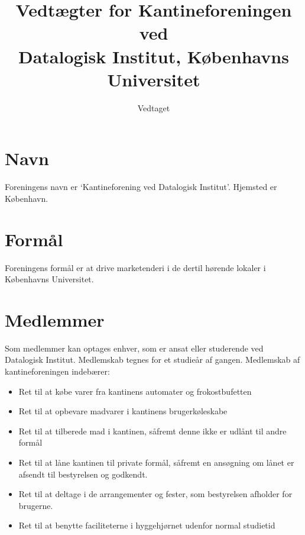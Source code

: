 \documentclass[a4paper, 10pt]{article}
\title{Vedtægter for Kantineforeningen ved \\ Datalogisk Institut,
Københavns Universitet}
\author{}
\date{Vedtaget \vedtagsdato{}}
\begin{document}
\maketitle
\thispagestyle{first}

\section{Navn}

\label{navn} Foreningens navn er `Kantineforening ved Datalogisk
Institut'. Hjemsted er København.

\section{Formål}

\label{formaal} Foreningens formål er at drive marketenderi i de
dertil hørende lokaler i Kø\-benhavns Universitet.

\section{Medlemmer}

\label{medlemmer} Som medlemmer kan optages enhver, som er ansat eller
studerende ved Datalogisk Institut. Medlemskab tegnes for et studieår
af gangen. Medlemskab af kantineforeningen indebærer:

\medskip

\begin{itemize}

\item Ret til at købe varer fra kantinens automater og frokostbufetten

\item Ret til at opbevare madvarer i kantinens brugerkøleskabe

\item Ret til at tilberede mad i kantinen, såfremt denne ikke er
udlånt til andre formål

\item Ret til at låne kantinen til private formål, såfremt en
ansøgning om lånet er afsendt til bestyrelsen og godkendt.

\item Ret til at deltage i de arrangementer og fester, som bestyrelsen
afholder for brugerne.

\item Ret til at benytte faciliteterne i hyggehjørnet udenfor normal
studietid

\end{itemize}
\end{document}
